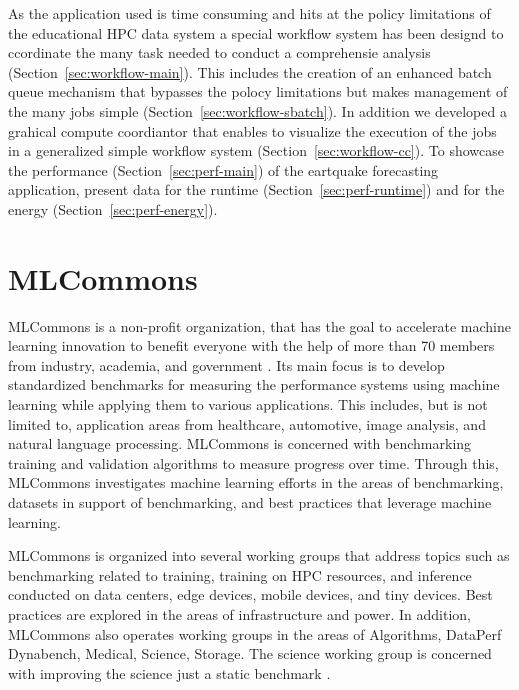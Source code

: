 \documentclass[utf8]{FrontiersinVancouver} %
\begin{document}
As the application used is time consuming and hits at the policy
limitations of the educational HPC data system a special workflow
system has been designd to ccordinate the many task needed to conduct
a comprehensie analysis (Section~\ref{sec:workflow-main}). This
includes the creation of an enhanced batch queue mechanism that
bypasses the polocy limitations but makes management of the many jobs
simple (Section~\ref{sec:workflow-sbatch}). In addition we developed a
grahical compute coordiantor that enables to visualize the execution
of the jobs in a generalized simple workflow system
(Section~\ref{sec:workflow-cc}).  To showcase the performance
(Section~\ref{sec:perf-main}) of the eartquake forecasting
application, present data for the runtime
(Section~\ref{sec:perf-runtime}) and for the energy
(Section~\ref{sec:perf-energy}).






\section{MLCommons}
\label{sec:mlcommons}

MLCommons is a non-profit organization, that has the goal to
accelerate machine learning innovation to benefit everyone with the
help of more than 70 members from industry, academia, and government
\cite{www-mlcommons}. Its main focus is to develop standardized
benchmarks for measuring the performance systems using machine
learning while applying them to various applications.  This includes,
but is not limited to, application areas from healthcare, automotive,
image analysis, and natural language processing. MLCommons is
concerned with benchmarking training \cite{mlperf-training} and
validation algorithms to measure progress over time.  Through this,
MLCommons investigates machine learning efforts in the areas of
benchmarking, datasets in support of benchmarking, and best practices
that leverage machine learning.

MLCommons is organized into several working groups that address topics
such as benchmarking related to training, training on HPC resources,
and inference conducted on data centers, edge devices, mobile devices, and
tiny devices. Best practices are explored in the areas of
infrastructure and power.  In addition, MLCommons also operates
working groups in the areas of Algorithms, DataPerf Dynabench,
Medical, Science, Storage.  The science working group is concerned
with improving the science just a static benchmark \cite{las-22-mlcommons-science}.
\end{document}
